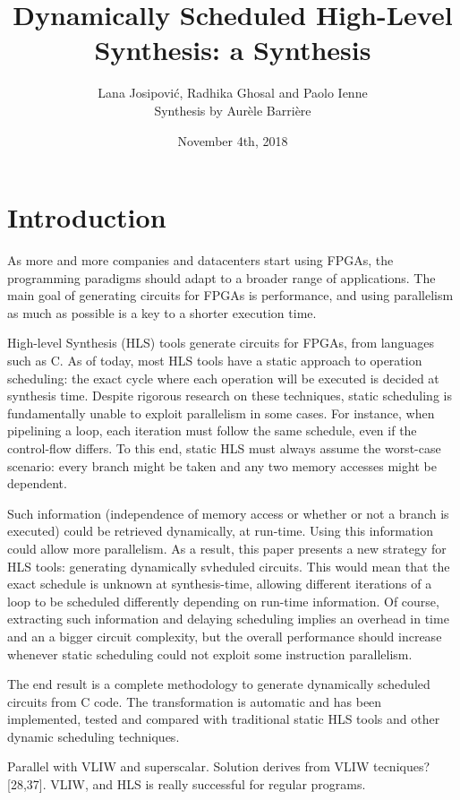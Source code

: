 \documentclass{article}
\title{Dynamically Scheduled High-Level Synthesis: a Synthesis}
\author{Lana Josipovi\'c, Radhika Ghosal and Paolo Ienne\\ Synthesis by Aur\`ele Barri\`ere}
\date{November 4th, 2018}
\def\todo#1{{\color{red}#1}}
\begin{document}
\maketitle

\section{Introduction}
As more and more companies and datacenters start using FPGAs, the programming paradigms should adapt to a broader range of applications.
The main goal of generating circuits for FPGAs is performance, and using parallelism as much as possible is a key to a shorter execution time.

High-level Synthesis (HLS) tools generate circuits for FPGAs, from languages such as C.
As of today, most HLS tools have a static approach to operation scheduling: the exact cycle where each operation will be executed is decided at synthesis time.
Despite rigorous research on these techniques, static scheduling is fundamentally unable to exploit parallelism in some cases.
For instance, when pipelining a loop, each iteration must follow the same schedule, even if the control-flow differs. To this end, static HLS must always assume the worst-case scenario: every branch might be taken and any two memory accesses might be dependent.

Such information (independence of memory access or whether or not a branch is executed) could be retrieved dynamically, at run-time. Using this information could allow more parallelism.
As a result, this paper presents a new strategy for HLS tools: generating dynamically svheduled circuits.
This would mean that the exact schedule is unknown at synthesis-time, allowing different iterations of a loop to be scheduled differently depending on run-time information.
Of course, extracting such information and delaying scheduling implies an overhead in time and an a bigger circuit complexity, but the overall performance should increase whenever static scheduling could not exploit some instruction parallelism.

The end result is a complete methodology to generate dynamically scheduled circuits from C code. The transformation is automatic and has been implemented, tested and compared with traditional static HLS tools and other dynamic scheduling techniques.


\todo{Parallel with VLIW and superscalar. Solution derives from VLIW tecniques? [28,37].
VLIW, and HLS is really successful for regular programs.}
\end{document}
